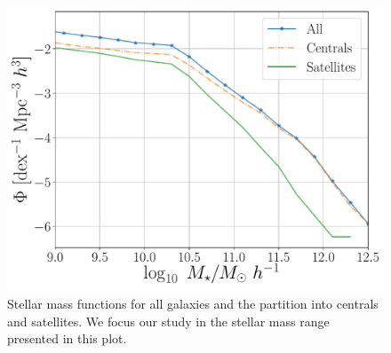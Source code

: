\documentclass[fleqn,usenatbib]{mnras}
\begin{document}
\begin{figure}
    \centering
    \includegraphics[width=1\columnwidth]{figuras/Histogramas.pdf}
    \caption{Stellar mass functions for all galaxies and the partition
      into centrals and satellites. We focus our study in the stellar
      mass range presented in this plot.} 
    \label{fig:stellar_fuction}
\end{figure}
\end{document}
